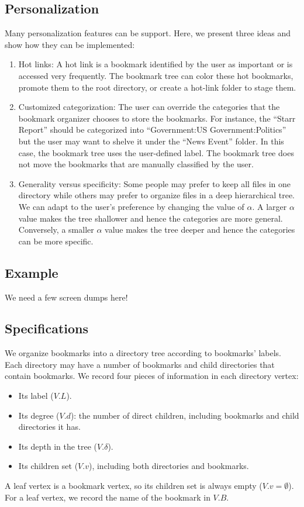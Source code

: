 \subsection{Personalization}
\label{sec-person}

Many personalization features can be support. Here,
we present three ideas and show how they can be implemented:
\begin{enumerate}
\item Hot links:
A hot link is a bookmark identified by the user
as important or is accessed very frequently.
The bookmark tree can color these hot
bookmarks, promote them
to the root directory, or create a hot-link folder
to stage them.

\item Customized categorization:
The user can override the categories that the bookmark
organizer chooses to store the bookmarks. For instance,
the ``Starr Report'' should be categorized into
``Government:US Government:Politics'' but
the user may want to shelve it under the 
``News Event'' folder. In this case, the bookmark
tree uses the user-defined label.
The bookmark tree does not
move the bookmarks that are manually classified by
the user. 

\item Generality versus specificity:
Some people may prefer to keep all files in one directory
while others may prefer to organize files 
in a deep hierarchical tree. We can  
adapt to the user's preference by
changing the value of $\alpha$. A larger $\alpha$ value
makes the tree shallower and hence the categories are more general.
Conversely, a smaller $\alpha$ value makes the tree deeper
and hence the categories can be more specific. 
\end{enumerate}

\subsection{Example}
\label{sec-ex1}

We need a few screen dumps here!

\subsection{Specifications}

We organize bookmarks into a directory tree according to 
bookmarks' labels.  Each directory may have a number of 
bookmarks and child directories that contain bookmarks.  We 
record four pieces of information in each directory vertex:
\begin{itemize}
\item Its label ($V.L$).
\item Its degree ($V.d$): the number of direct children, including 
bookmarks and child directories it has.
\item Its depth in the tree ($V.\delta$). 
\item Its children set ($V.v$), including both directories and bookmarks.
\end{itemize}
A leaf vertex is a bookmark vertex, so its children set is always empty
($V.v = \emptyset$).  For a leaf vertex, we record the name of the 
bookmark in $V.B$.

